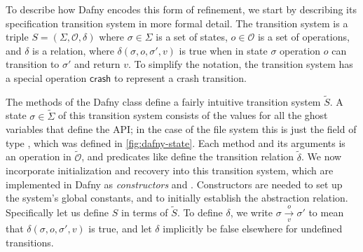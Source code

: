 \newcommand{\Op}{\mathcal{O}}

To describe how Dafny encodes this form of refinement, we start by describing its
specification transition system in more formal detail. The transition system is
a triple $S = (\Sigma, \Op, \delta)$ where $\sigma \in \Sigma$ is a set of states,
$o \in \Op$ is a set of operations, and $\delta$ is a relation, where
$\delta(\sigma, o, \sigma', v)$ is true when in state $\sigma$ operation $o$ can
transition to $\sigma'$ and return $v$. To simplify the notation, the transition
system has a special operation $\mathsf{crash}$ to represent a crash transition.

\newcommand{\altsys}[1]{\tilde{#1}}

The methods of the Dafny class define a fairly intuitive transition system
$\altsys{S}$. A state $\sigma \in \altsys{\Sigma}$ of this transition system
consists of the values for all the ghost variables that define the API; in the
case of the file system this is just the  field of type
, which was defined in \cref{fig:dafny-state}. Each method and its
arguments is an operation in $\altsys{\Op}$, and predicates like 
define the transition relation $\altsys{\delta}$. We now incorporate
initialization and recovery into this transition system, which are implemented
in Dafny as \emph{constructors}  and . Constructors are
needed to set up the system's global constants, and to initially establish the
abstraction relation. Specifically let us define $S$ in terms of $\altsys{S}$.
To define $\delta$, we write $\sigma \xrightarrow[v]{o} \sigma'$ to mean that
$\delta(\sigma, o, \sigma', v)$ is true, and let $\delta$ implicitly be false
elsewhere for undefined transitions.

